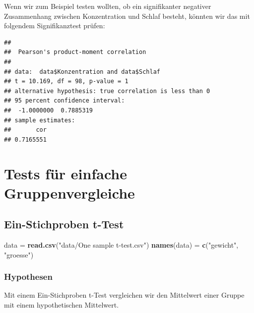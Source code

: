 \documentclass[
]{book}
\newenvironment{Shaded}{\begin{snugshade}}{\end{snugshade}}
\newcommand{\AttributeTok}[1]{\textcolor[rgb]{0.13,0.29,0.53}{#1}}
\newcommand{\FunctionTok}[1]{\textcolor[rgb]{0.13,0.29,0.53}{\textbf{#1}}}
\newcommand{\NormalTok}[1]{#1}
\newcommand{\OtherTok}[1]{\textcolor[rgb]{0.56,0.35,0.01}{#1}}
\newcommand{\SpecialCharTok}[1]{\textcolor[rgb]{0.81,0.36,0.00}{\textbf{#1}}}
\newcommand{\StringTok}[1]{\textcolor[rgb]{0.31,0.60,0.02}{#1}}
\begin{document}
Wenn wir zum Beispiel testen wollten, ob ein signifikanter negativer Zusammenhang zwischen Konzentration und Schlaf besteht, könnten wir das mit folgendem Signifikanztest prüfen:

\begin{Shaded}
\end{Shaded}

\begin{verbatim}
## 
##  Pearson's product-moment correlation
## 
## data:  data$Konzentration and data$Schlaf
## t = 10.169, df = 98, p-value = 1
## alternative hypothesis: true correlation is less than 0
## 95 percent confidence interval:
##  -1.0000000  0.7885319
## sample estimates:
##       cor 
## 0.7165551
\end{verbatim}

\chapter{Tests für einfache Gruppenvergleiche}\label{tests-fuxfcr-einfache-gruppenvergleiche}

\section{Ein-Stichproben t-Test}\label{ein-stichproben-t-test}

\begin{Shaded}
\begin{Highlighting}[]
\NormalTok{data }\OtherTok{=} \FunctionTok{read.csv}\NormalTok{(}\StringTok{"data/One sample t{-}test.csv"}\NormalTok{)}
\FunctionTok{names}\NormalTok{(data) }\OtherTok{=} \FunctionTok{c}\NormalTok{(}\StringTok{"gewicht"}\NormalTok{, }\StringTok{"groesse"}\NormalTok{)}
\end{Highlighting}
\end{Shaded}

\subsection{Hypothesen}\label{hypothesen-1}

Mit einem Ein-Stichproben t-Test vergleichen wir den Mittelwert einer Gruppe mit einem hypothetischen Mittelwert.
\end{document}
